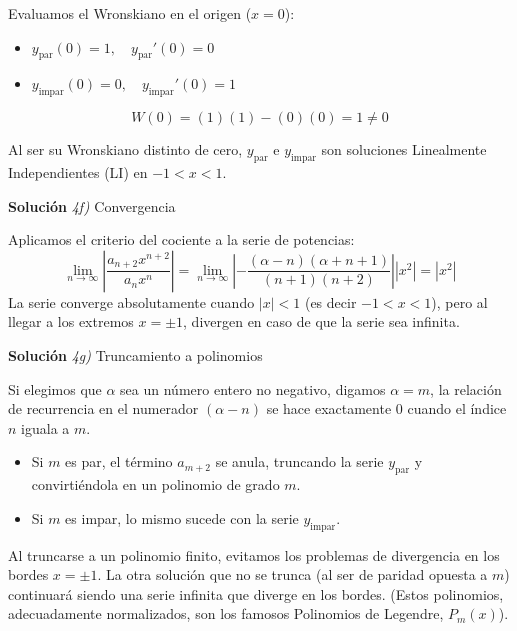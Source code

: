 \documentclass[11pt,spanish]{article}
\newcounter{problema}
\begin{document}
Evaluamos el Wronskiano en el origen ($x=0$):
\begin{itemize}
\item $y_{\text{par}}(0) = 1, \quad y_{\text{par}}'(0) = 0$
\item $y_{\text{impar}}(0) = 0, \quad y_{\text{impar}}'(0) = 1$
\end{itemize}
$$W(0) = (1)(1) - (0)(0) = 1 \neq 0$$

Al ser su Wronskiano distinto de cero, $y_{\text{par}}$ e $y_{\text{impar}}$ son soluciones Linealmente Independientes (LI) en $-1<x<1$.

\vspace{0.5cm}
{\bf Soluci\'on }{\em 4f)}
Convergencia
\vspace{0.5cm}

Aplicamos el criterio del cociente a la serie de potencias:
$$\lim_{n\to\infty} \left| \frac{a_{n+2}x^{n+2}}{a_n x^n} \right| = \lim_{n\to\infty} \left| -\frac{(\alpha-n)(\alpha+n+1)}{(n+1)(n+2)} \right| |x^2| = |x^2|$$
La serie converge absolutamente cuando $|x| < 1$ (es decir $-1<x<1$), pero al llegar a los extremos $x = \pm 1$, divergen en caso de que la serie sea infinita.

\vspace{0.5cm}
{\bf Soluci\'on }{\em 4g)}
Truncamiento a polinomios
\vspace{0.5cm}

Si elegimos que $\alpha$ sea un número entero no negativo, digamos $\alpha = m$, la relación de recurrencia en el numerador $(\alpha-n)$ se hace exactamente $0$ cuando el índice $n$ iguala a $m$.
\begin{itemize}
\item Si $m$ es par, el término $a_{m+2}$ se anula, truncando la serie $y_{\text{par}}$ y convirtiéndola en un polinomio de grado $m$.
\item Si $m$ es impar, lo mismo sucede con la serie $y_{\text{impar}}$.
\end{itemize}
Al truncarse a un polinomio finito, evitamos los problemas de divergencia en los bordes $x=\pm 1$. La otra solución que no se trunca (al ser de paridad opuesta a $m$) continuará siendo una serie infinita que diverge en los bordes. (Estos polinomios, adecuadamente normalizados, son los famosos Polinomios de Legendre, $P_m(x)$).
\end{document}
